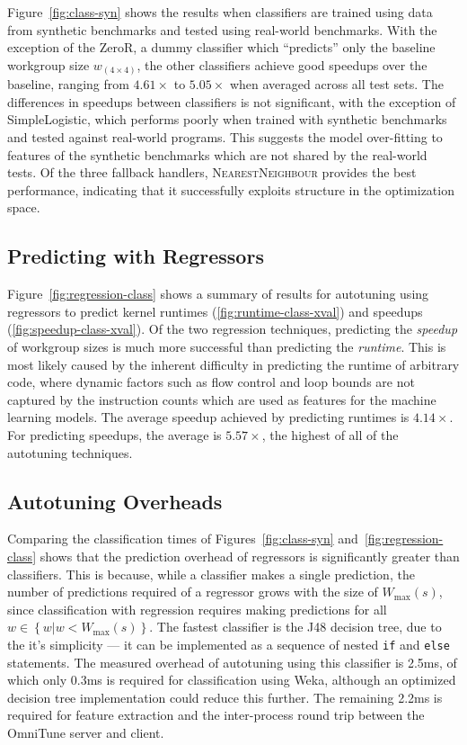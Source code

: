   Figure~\ref{fig:class-syn} shows the results when classifiers are
  trained using data from synthetic benchmarks and tested using
  real-world benchmarks. With the exception of the ZeroR, a dummy
  classifier which ``predicts'' only the baseline workgroup size
  $w_{\left( 4 \times 4 \right)}$, the other classifiers achieve good
  speedups over the baseline, ranging from $4.61\times$ to $5.05\times$
  when averaged across all test sets. The differences in speedups
  between classifiers is not significant, with the exception of
  SimpleLogistic, which performs poorly when trained with synthetic
  benchmarks and tested against real-world programs. This suggests the
  model over-fitting to features of the synthetic benchmarks which are
  not shared by the real-world tests. Of the three fallback handlers,
  \textsc{NearestNeighbour} provides the best performance, indicating
  that it successfully exploits structure in the optimization space.


  \subsection{Predicting with Regressors}

  Figure~\ref{fig:regression-class} shows a summary of results for
  autotuning using regressors to predict kernel runtimes
  (\ref{fig:runtime-class-xval}) and speedups
  (\ref{fig:speedup-class-xval}). Of the two regression techniques,
  predicting the \emph{speedup} of workgroup sizes is much more
  successful than predicting the \emph{runtime}. This is most likely
  caused by the inherent difficulty in predicting the runtime of
  arbitrary code, where dynamic factors such as flow control and loop
  bounds are not captured by the instruction counts which are used as
  features for the machine learning models. The average speedup achieved
  by predicting runtimes is $4.14\times$. For predicting speedups, the
  average is $5.57\times$, the highest of all of the autotuning
  techniques.


  \subsection{Autotuning Overheads}

  Comparing the classification times of Figures~\ref{fig:class-syn}
  and~\ref{fig:regression-class} shows that the prediction overhead of
  regressors is significantly greater than classifiers. This is because,
  while a classifier makes a single prediction, the number of
  predictions required of a regressor grows with the size of
  $W_{\max}(s)$, since classification with regression requires making
  predictions for all $w \in \left\{ w | w < W_{\max}(s) \right\}$. The
  fastest classifier is the J48 decision tree, due to the it's
  simplicity --- it can be implemented as a sequence of nested
  \texttt{if} and \texttt{else} statements. The measured overhead of
  autotuning using this classifier is 2.5ms, of which only 0.3ms is
  required for classification using Weka, although an optimized decision
  tree implementation could reduce this further. The remaining 2.2ms is
  required for feature extraction and the inter-process round trip
  between the OmniTune server and client.

